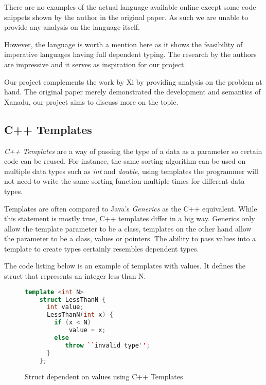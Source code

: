 \documentclass[a4paper,12pt]{report}
\begin{document}
\par
There are no examples of the actual language available online except some code 
snippets shown by the author in the original paper. As such we are unable to 
provide any analysis on the language itself.

\par
However, the language is worth a mention here as it shows the feasibility of 
imperative languages having full dependent typing. The research by the authors 
are impressive and it serves as inspiration for our project. 

\par
Our project complements the work by Xi by providing analysis on the problem at 
hand. The original paper merely demonstrated the development and semantics of 
Xanadu, our project aims to discuss more on the topic. 

\subsection{C++ Templates}
\textit{C++ Templates} \cite{cppTemplate} are a way of passing the type of a 
data as a parameter so certain code can be reused. For instance, the same 
sorting algorithm can be used on multiple data types such as \textit{int} and 
\textit{double}, using templates the programmer will not need to write the same 
sorting function multiple times for different data types. 

\par
Templates are often compared to Java's \textit{Generics} \cite{javaGenerics} 
as the C++ equivalent. While this statement is mostly true, C++ templates 
differ in a big way. 
Generics only allow the template parameter to be a class, templates on the other 
hand allow the parameter to be a class, values or pointers. The ability to 
pass values into a template to create types certainly resembles dependent types.

\par
The code listing below is an example of templates with values. It defines the 
struct that represents an integer less than N. 

\begin{figure}[H]
  \begin{lstlisting}[language=c++]     
    template <int N>
    struct LessThanN {
      int value;
      LessThanN(int x) {
        if (x < N)
            value = x;
        else
           throw ``invalid type'';
      }
    };
  \end{lstlisting}
  \caption{Struct dependent on values using C++ Templates}
\end{figure}
\end{document}
